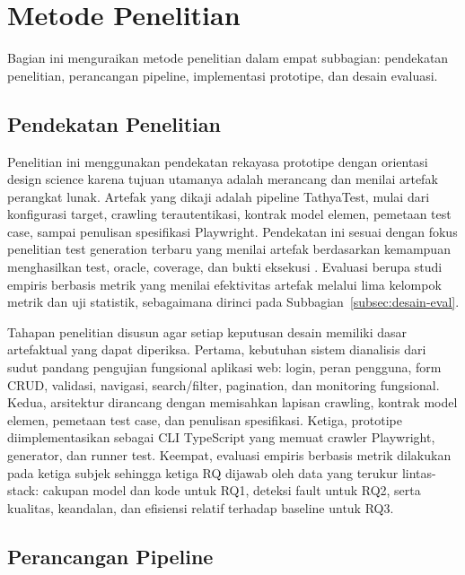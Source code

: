 \documentclass[conference]{IEEEtran}
\begin{document}
\section{Metode Penelitian}
\label{sec:metode}

Bagian ini menguraikan metode penelitian dalam empat subbagian: pendekatan penelitian, perancangan pipeline, implementasi prototipe, dan desain evaluasi.

\subsection{Pendekatan Penelitian}

Penelitian ini menggunakan pendekatan rekayasa prototipe dengan orientasi design science karena tujuan utamanya adalah merancang dan menilai artefak perangkat lunak. Artefak yang dikaji adalah pipeline TathyaTest, mulai dari konfigurasi target, crawling terautentikasi, kontrak model elemen, pemetaan test case, sampai penulisan spesifikasi Playwright. Pendekatan ini sesuai dengan fokus penelitian test generation terbaru yang menilai artefak berdasarkan kemampuan menghasilkan test, oracle, coverage, dan bukti eksekusi \cite{sunman2022automated,yandrapally2023fragment,hossain2022oracleadequacy,erni2024sbft}. Evaluasi berupa studi empiris berbasis metrik yang menilai efektivitas artefak melalui lima kelompok metrik dan uji statistik, sebagaimana dirinci pada Subbagian~\ref{subsec:desain-eval}.

Tahapan penelitian disusun agar setiap keputusan desain memiliki dasar artefaktual yang dapat diperiksa. Pertama, kebutuhan sistem dianalisis dari sudut pandang pengujian fungsional aplikasi web: login, peran pengguna, form CRUD, validasi, navigasi, search/filter, pagination, dan monitoring fungsional. Kedua, arsitektur dirancang dengan memisahkan lapisan crawling, kontrak model elemen, pemetaan test case, dan penulisan spesifikasi. Ketiga, prototipe diimplementasikan sebagai CLI TypeScript yang memuat crawler Playwright, generator, dan runner test. Keempat, evaluasi empiris berbasis metrik dilakukan pada ketiga subjek sehingga ketiga RQ dijawab oleh data yang terukur lintas-stack: cakupan model dan kode untuk RQ1, deteksi fault untuk RQ2, serta kualitas, keandalan, dan efisiensi relatif terhadap baseline untuk RQ3.

\subsection{Perancangan Pipeline}
\end{document}
